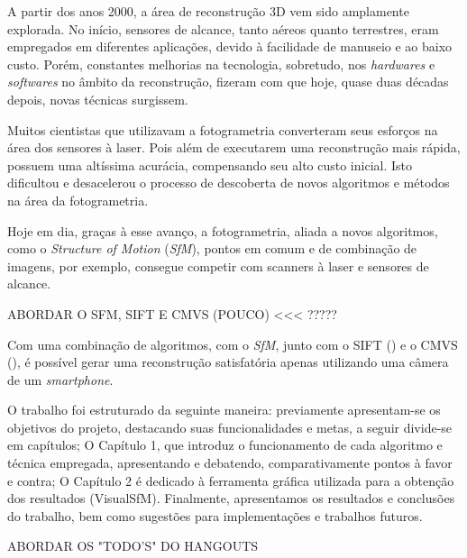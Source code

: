\documentclass[a4paper,12pt,oneside,onecolumn,final,fleqn]{repUERJ}
\theoremstyle{plain}
\theoremstyle{definition}
\begin{document}
A partir dos anos 2000, a área de reconstrução 3D vem sido amplamente explorada. No início, sensores de alcance, tanto aéreos quanto terrestres, eram empregados em diferentes aplicações, devido à facilidade de manuseio e ao baixo custo. Porém, constantes melhorias na tecnologia, sobretudo, nos {\it hardwares} e {\it softwares} no âmbito da reconstrução, fizeram com que hoje, quase duas décadas depois, novas técnicas surgissem.

Muitos cientistas que utilizavam a fotogrametria converteram seus esforços na área dos sensores à laser. Pois além de executarem uma reconstrução mais rápida, possuem uma altíssima acurácia, compensando seu alto custo inicial. Isto dificultou e desacelerou o processo de descoberta de novos algoritmos e métodos na área da fotogrametria. 

Hoje em dia, graças à esse avanço, a fotogrametria, aliada a novos algoritmos, como o  {\it Structure of Motion} ({\it SfM}), pontos em comum e de combinação de imagens, por exemplo, consegue competir com scanners à laser e sensores de alcance. 

 ABORDAR O SFM, SIFT E CMVS (POUCO) <<< ?????

Com uma combinação de algoritmos, com o {\it SfM}, junto com o SIFT ({\it }) e o CMVS ({\it }), é possível gerar uma reconstrução satisfatória apenas utilizando uma câmera de um {\it smartphone}.

O trabalho foi estruturado da seguinte maneira: previamente apresentam-se os objetivos do projeto, destacando suas funcionalidades e metas, a seguir divide-se em capítulos; O Capítulo 1, que introduz o funcionamento de cada algoritmo e técnica empregada, apresentando e debatendo, comparativamente pontos à favor e contra; O Capítulo 2 é dedicado à ferramenta gráfica utilizada para a obtenção dos resultados (VisualSfM). Finalmente, apresentamos os resultados e conclusões do trabalho, bem como sugestões para implementações e trabalhos futuros.

ABORDAR OS "TODO'S" DO HANGOUTS


\imprimirchaves



\end{document}
